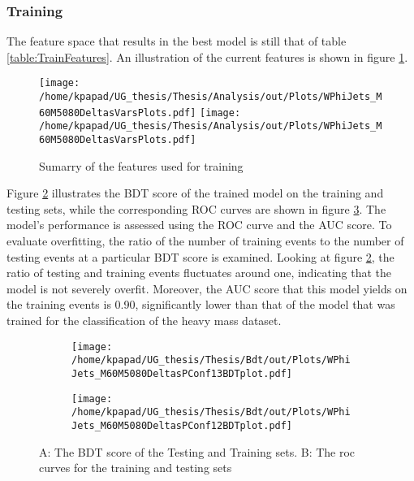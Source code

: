 \subsubsection{Training}
\label{sec:orgd9f6c6d}
The feature space that results in the best model is still that of table \ref{table:TrainFeatures}. An illustration of the current features is shown in figure \ref{fig:LightFeatures}.
\begin{figure}[h!]
\centering
\texttt{[image: /home/kpapad/UG\_thesis/Thesis/Analysis/out/Plots/WPhiJets\_M60M5080DeltasVarsPlots.pdf]}
\texttt{[image: /home/kpapad/UG\_thesis/Thesis/Analysis/out/Plots/WPhiJets\_M60M5080DeltasVarsPlots.pdf]}
\caption{Sumarry of the features used for training }
\label{fig:LightFeatures}
\end{figure}

Figure \ref{subfig:LightBdtPlot} illustrates the BDT score of the trained model on the training and testing sets, while the corresponding ROC curves are shown in figure \ref{subfig:LightROCCurves}. The model's performance is assessed using the ROC curve and the AUC score. To evaluate overfitting, the ratio of the number of training events to the number of testing events at a particular BDT score is examined. Looking at figure \ref{subfig:LightBdtPlot}, the ratio of testing and training events fluctuates around one, indicating that the model is not severely overfit. Moreover, the AUC score that this model yields on the training events is 0.90, significantly lower than that of the model that was trained for the classification of the heavy mass dataset.
\begin{figure}[h!]
\centering
\begin{subfigure}{0.49\textwidth}
\centering
\texttt{[image: /home/kpapad/UG\_thesis/Thesis/Bdt/out/Plots/WPhiJets\_M60M5080DeltasPConf13BDTplot.pdf]}
\caption{}
\label{subfig:LightBdtPlot}
\end{subfigure}
\begin{subfigure}{0.49\textwidth}
\centering
\texttt{[image: /home/kpapad/UG\_thesis/Thesis/Bdt/out/Plots/WPhiJets\_M60M5080DeltasPConf12BDTplot.pdf]}
\caption{}
\label{subfig:LightROCCurves}
\end{subfigure}
\caption{A: The BDT score of the Testing and Training sets. B: The roc curves for the training and testing sets}
\label{fig:BDTplot}
\end{figure}

